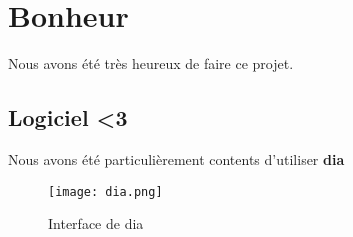 \section{Bonheur}
Nous avons été très heureux de faire ce projet.

\subsection{Logiciel <3}
Nous avons été particulièrement contents d'utiliser \textbf{dia}

\begin{figure}[h]
  \center
  \texttt{[image: dia.png]}
  \caption{\label{fig:dia} Interface de dia}
\end{figure}
